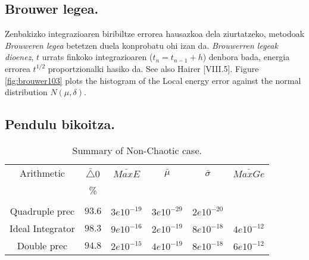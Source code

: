 \subsection{Brouwer legea.}

Zenbakizko integrazioaren biribiltze errorea hausazkoa dela ziurtatzeko, metodoak \emph{Brouweren legea} \cite{Brouwer1937} betetzen duela konprobatu ohi izan da. \emph{Brouwerren legeak dioenez}, $t$ urrats finkoko integrazioaren ($t_n=t_{n-1}+h$) denbora bada, energia errorea $t^{1/2}$ proportzionalki hasiko da.  See also Hairer \cite{Hairer2006}[VIII.5]. Figure \ref{fig:brouwer103} plots the histogram of the Local energy error against the normal distribution $N(\mu, \delta)$.

\subsection{Pendulu bikoitza.}

\begin{table} [h]
\caption{Summary of Non-Chaotic case.}
\label{tab:2}       %
\begin{tabular}{c|c c c c c} 
 Arithmetic   &  $\bar{\triangle}0$  &  $\bar{MaxE}$ & $\bar{\mu}$  & $\bar{\sigma}$   & $\bar{MaxGe}$  \\
                           &   \%            &       &          &            &         \\
 \hline
                           &                 &         &       &           &          \\
 Quadruple prec            &   $93.6$        &  $3e10^{-19}$  & $3e10^{-29}$  & $2e10^{-20}$  &      \\	    
 Ideal Integrator          &   $98.3$        &  $9e10^{-16}$  & $2e10^{-19}$  & $8e10^{-18}$ &  $4e10^{-12}$\\
 Double prec               &   $94.8$        &  $2e10^{-15}$  & $4e10^{-19}$  & $8e10^{-18}$ &  $6e10^{-12}$\\
\end{tabular}
\end{table}

